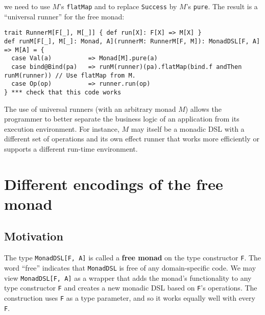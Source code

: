 we need to use $M$\textsf{'}s \lstinline!flatMap!
and to replace \lstinline!Success!
by $M$\textsf{'}s \lstinline!pure!.
The result is a \textsf{``}universal runner\textsf{''}
for the free monad:
\begin{lstlisting}
trait RunnerM[F[_], M[_]] { def run[X]: F[X] => M[X] }
def runM[F[_], M[_]: Monad, A](runnerM: RunnerM[F, M]): MonadDSL[F, A] => M[A] = {
  case Val(a)          => Monad[M].pure(a)
  case bind@Bind(pa)   => runM(runner)(pa).flatMap(bind.f andThen runM(runner)) // Use flatMap from M.
  case Op(op)          => runner.run(op)
} *** check that this code works
\end{lstlisting}
The use of universal runners (with an arbitrary monad $M$) allows
the programmer to better separate the business logic of an application
from its execution environment. For instance, $M$ may itself be a
monadic DSL with a different set of operations and its own effect
runner that works more efficiently or supports a different run-time
environment.

\section{Different encodings of the free monad}

\subsection{Motivation\label{subsec:Motivation-free-monad-different-encodings}}

The type \lstinline!MonadDSL[F, A]!
is called a \textbf{free monad} on the type constructor
\lstinline!F!. The word
\textsf{``}free\textsf{''} indicates that \lstinline!MonadDSL!
is free of any domain-specific code. We may view \lstinline!MonadDSL[F, A]!
as a wrapper that adds the monad\textsf{'}s functionality to any type constructor
\lstinline!F! and creates
a new monadic DSL based on \lstinline!F!\textsf{'}s
operations. The construction uses \lstinline!F!
as a type parameter, and so it works equally well with every \lstinline!F!.

